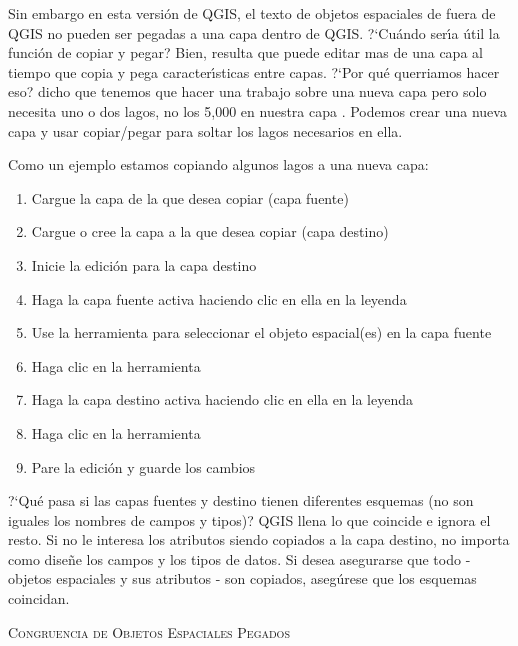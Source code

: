Sin embargo en esta versi\'on de QGIS, el texto de objetos espaciales de fuera de QGIS no pueden 
ser pegadas a una capa dentro de QGIS. ?`Cu\'ando ser\'{\i}a \'util la funci\'on de copiar y pegar? 
Bien, resulta que puede editar mas de una capa 
al tiempo que copia y pega caracter\'{\i}sticas entre capas. ?`Por qu\'e querriamos hacer
eso?  dicho que tenemos que hacer una trabajo sobre una nueva capa pero solo necesita uno o
dos lagos, no los 5,000 en nuestra capa . Podemos crear una nueva capa
y usar copiar/pegar para soltar los lagos necesarios en ella. 

Como un ejemplo estamos copiando algunos lagos a una nueva capa:

\begin{enumerate}
\item Cargue la capa de la que desea copiar (capa fuente)
\item Cargue o cree la capa a la que desea copiar (capa destino) 
\item Inicie la edici\'on para la capa destino
\item Haga la capa fuente activa haciendo clic en ella en la leyenda 
\item Use la herramienta  para seleccionar el objeto espacial(es) en la capa fuente
\item Haga clic en la herramienta 
\item Haga la capa destino activa haciendo clic en ella en la leyenda 
\item Haga clic en la herramienta 
\item Pare la edici\'on y guarde los cambios
\end{enumerate}

?`Qu\'e pasa si las capas fuentes y destino tienen
diferentes esquemas (no son iguales los nombres de campos y tipos)? QGIS llena
lo que coincide e ignora el resto. Si no le interesa los atributos
siendo copiados a la capa destino, no importa como dise\~ne los
campos y los tipos de datos. Si desea asegurarse que todo - objetos espaciales y sus
atributos - son copiados, aseg\'urese que los esquemas coincidan.

\begin{Tip}[ht]\caption{\textsc{Congruencia de Objetos Espaciales Pegados}}
\end{Tip}

